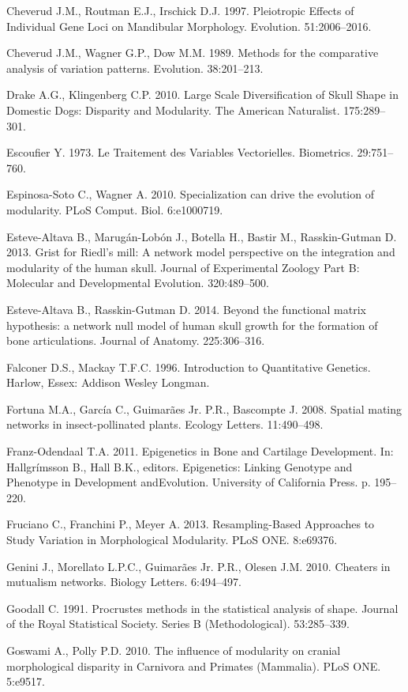 \documentclass[12pt,]{article}
\begin{document}
Cheverud J.M., Routman E.J., Irschick D.J. 1997. Pleiotropic Effects of
Individual Gene Loci on Mandibular Morphology. Evolution. 51:2006--2016.

Cheverud J.M., Wagner G.P., Dow M.M. 1989. Methods for the comparative
analysis of variation patterns. Evolution. 38:201--213.

Drake A.G., Klingenberg C.P. 2010. Large Scale Diversification of Skull
Shape in Domestic Dogs: Disparity and Modularity. The American
Naturalist. 175:289--301.

Escoufier Y. 1973. Le Traitement des Variables Vectorielles. Biometrics.
29:751--760.

Espinosa-Soto C., Wagner A. 2010. Specialization can drive the evolution
of modularity. PLoS Comput. Biol. 6:e1000719.

Esteve-Altava B., Marugán-Lobón J., Botella H., Bastir M.,
Rasskin-Gutman D. 2013. Grist for Riedl's mill: A network model
perspective on the integration and modularity of the human skull.
Journal of Experimental Zoology Part B: Molecular and Developmental
Evolution. 320:489--500.

Esteve-Altava B., Rasskin-Gutman D. 2014. Beyond the functional matrix
hypothesis: a network null model of human skull growth for the formation
of bone articulations. Journal of Anatomy. 225:306--316.

Falconer D.S., Mackay T.F.C. 1996. Introduction to Quantitative
Genetics. Harlow, Essex: Addison Wesley Longman.

Fortuna M.A., García C., Guimarães Jr. P.R., Bascompte J. 2008. Spatial
mating networks in insect-pollinated plants. Ecology Letters.
11:490--498.

Franz-Odendaal T.A. 2011. Epigenetics in Bone and Cartilage Development.
In: Hallgrímsson B., Hall B.K., editors. Epigenetics: Linking Genotype
and Phenotype in Development andEvolution. University of California
Press. p. 195--220.

Fruciano C., Franchini P., Meyer A. 2013. Resampling-Based Approaches to
Study Variation in Morphological Modularity. PLoS ONE. 8:e69376.

Genini J., Morellato L.P.C., Guimarães Jr. P.R., Olesen J.M. 2010.
Cheaters in mutualism networks. Biology Letters. 6:494--497.

Goodall C. 1991. Procrustes methods in the statistical analysis of
shape. Journal of the Royal Statistical Society. Series B
(Methodological). 53:285--339.

Goswami A., Polly P.D. 2010. The influence of modularity on cranial
morphological disparity in Carnivora and Primates (Mammalia). PLoS ONE.
5:e9517.
\end{document}
